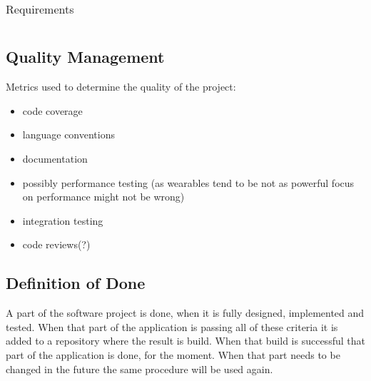 \begin{table}[htbp]
\begin{tabular}{c}

\end{tabular}
\caption{Requirements}
\label{tab:requirements}
\end{table}
\subsection{Quality Management}
Metrics used to determine the quality of the project:

\begin{itemize}
	\item code coverage
	\item language conventions
	\item documentation
	\item possibly performance testing (as wearables tend to be not as powerful focus on performance might not be wrong)
	\item integration testing
	\item code reviews(?)
\end{itemize}
\subsection{Definition of Done}
A part of the software project is done, when it is fully designed, implemented and tested. When that part of the application is passing all of these criteria it is added to a repository where the result is build. When that build is successful that part of the application is done, for the moment. When that part needs to be changed in the future the same procedure will be used again.